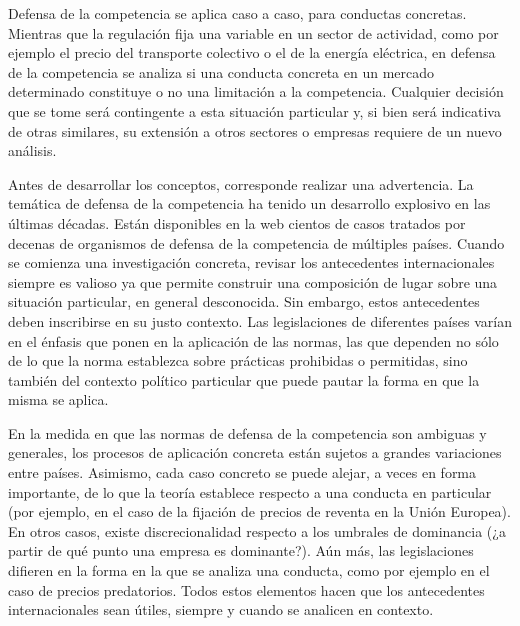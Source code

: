\documentclass[
  12pt,
  spanish,
]{book}
\begin{document}
Defensa de la competencia se aplica caso a caso, para conductas
concretas. Mientras que la regulación fija una variable en un sector de
actividad, como por ejemplo el precio del transporte colectivo o el de
la energía eléctrica, en defensa de la competencia se analiza si una
conducta concreta en un mercado determinado constituye o no una
limitación a la competencia. Cualquier decisión que se tome será
contingente a esta situación particular y, si bien será indicativa de
otras similares, su extensión a otros sectores o empresas requiere de un
nuevo análisis.

Antes de desarrollar los conceptos, corresponde realizar una
advertencia. La temática de defensa de la competencia ha tenido un
desarrollo explosivo en las últimas décadas. Están disponibles en la web
cientos de casos tratados por decenas de organismos de defensa de la
competencia de múltiples países. Cuando se comienza una investigación
concreta, revisar los antecedentes internacionales siempre es valioso ya
que permite construir una composición de lugar sobre una situación
particular, en general desconocida. Sin embargo, estos antecedentes
deben inscribirse en su justo contexto. Las legislaciones de diferentes
países varían en el énfasis que ponen en la aplicación de las normas,
las que dependen no sólo de lo que la norma establezca sobre prácticas
prohibidas o permitidas, sino también del contexto político particular
que puede pautar la forma en que la misma se aplica.

En la medida en que las normas de defensa de la competencia son ambiguas
y generales, los procesos de aplicación concreta están sujetos a grandes
variaciones entre países. Asimismo, cada caso concreto se puede alejar,
a veces en forma importante, de lo que la teoría establece respecto a
una conducta en particular (por ejemplo, en el caso de la fijación de
precios de reventa en la Unión Europea). En otros casos, existe
discrecionalidad respecto a los umbrales de dominancia (¿a partir de qué
punto una empresa es dominante?). Aún más, las legislaciones difieren en
la forma en la que se analiza una conducta, como por ejemplo en el caso
de precios predatorios. Todos estos elementos hacen que los antecedentes
internacionales sean útiles, siempre y cuando se analicen en contexto.
\end{document}
